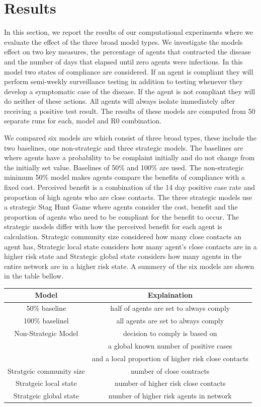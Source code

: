 \documentclass{article}
\begin{document}
\section{Results}

In this section, we report the results of our computational experiments where we evaluate the effect of the three broad model types. We investigate the models effect on two key measures, the percentage of agents that contracted the disease and the number of days that elapsed until zero agents were infectious.  In this model two states of compliance are considered. If an agent is compliant they will perform semi-weekly surveillance testing in addition to testing whenever they develop a symptomatic case of the disease. If the agent is not compliant they will do neither of these actions. All agents will always isolate immediately after receiving a positive test result. The results of these models are computed from 50 separate runs for each, model and R0 combination. \newline

We compared six models are which consist of three broad types, these include the two baselines, one non-strategic and three strategic models. The baselines are where agents have a probability to be complaint initially and do not change from the initially set value. Baselines of 50\% and 100\% are used. The non-strategic minimum 50\% model makes agents compare the benefits of compliance with a fixed cost. Perceived benefit is a combination of the 14 day positive case rate and proportion of high agents who are close contacts. The three strategic models use a strategic Stag Hunt Game where agents consider the cost, benefit and the proportion of agents who need to be compliant for the benefit to occur. The strategic models differ with how the perceived benefit for each agent is calculation. Strategic community size considered how many close contacts an agent has, Strategic local state considers how many agent’s close contacts are in a higher risk state and Strategic global state considers how many agents in the entire network are in a higher risk state. A summery of the six models are shown in the table bellow. \newline

\begin{tabular}{|c|c|}
\hline
Model & Explaination \\ \hline
50\% baseline & half of agents are set to always comply \\ \hline
100\% baselinel & all agents are set to always comply \\ \hline
Non-Strategic Model & decision to comply is based on\\ 
 & a global known number of positive cases\\
 & and a local proportion of higher risk close contacts\\\hline
Stratgeic community size & number of close contracts\\\hline
Stratgeic local state & number of higher risk close contacts \\\hline
Stratgeic global state & number of higher risk agents in network\\ \hline
\end{tabular}
\end{document}
